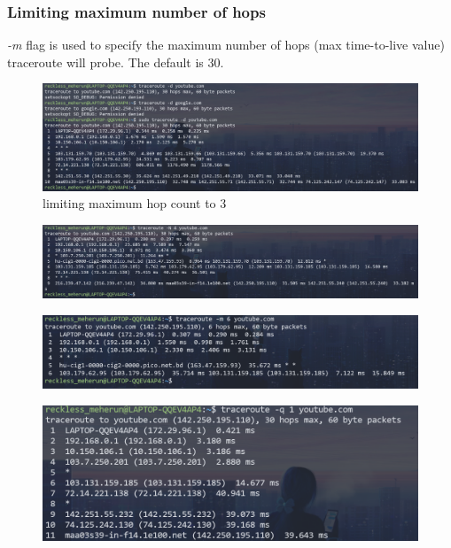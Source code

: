 \documentclass[11pt]{article}
\begin{document}
\subsubsection*{Limiting maximum number of hops}
\emph{-m} flag is used to specify  the maximum number of hops (max time-to-live value) traceroute will probe. The default is 30.
\begin{figure}[H]
\centering
\includegraphics[width=\textwidth]{res/traceroute 2.png}
\caption{limiting maximum hop count to 3}
\end{figure}
\begin{figure}[H]
\centering
\includegraphics[width=\textwidth]{res/traceroute 3.png}
\end{figure}
\begin{figure}[H]
\centering
\includegraphics[width=\textwidth]{res/traceroute 4.png}
\end{figure}
\begin{figure}[H]
\centering
\includegraphics[width=\textwidth]{res/traceroute 5.png}
\end{figure}
\end{document}
